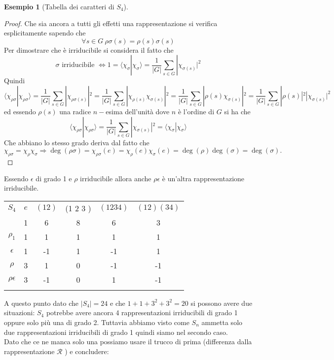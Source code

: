 \documentclass[11pt]{article}
\theoremstyle{plain}
\theoremstyle{definition}
\newtheorem{exmp}{Esempio}[section]
\theoremstyle{remark}
\begin{document}
\begin{exmp}[Tabella dei caratteri di $S_4$]
\begin{proof}
Che sia ancora a tutti gli effetti una rappresentazione si verifica esplicitamente sapendo che
\[
\forall s\in G\ \rho\sigma(s)=\rho(s)\sigma(s)
\]
Per dimostrare che è irriducibile si considera il fatto che
\[
\sigma \text{ irriducibile } \Leftrightarrow 1=\langle\chi_{\sigma}|\chi_{\sigma}\rangle=\frac{1}{|G|}\sum_{s\in G}|\chi_{\sigma(s)}|^2
\]
Quindi
\[
\langle \chi_{\rho\sigma}|\chi_{\rho\sigma}\rangle=\frac{1}{|G|}\sum_{s\in G}|\chi_{\rho\sigma(s)}|^2=\frac{1}{|G|}\sum_{s\in G}|\chi_{\rho(s)}\chi_{\sigma(s)}|^2=\frac{1}{|G|}\sum_{s\in G}|\rho(s)\chi_{\sigma(s)}|^2=\frac{1}{|G|}\sum_{s\in G}|\rho(s)|^2|\chi_{\sigma(s)}|^2
\]
ed essendo $\rho(s)$ una radice $n-$esima dell'unità dove $n$ è l'ordine di $G$ si ha che
\[
\langle \chi_{\rho\sigma}|\chi_{\rho\sigma}\rangle=\frac{1}{|G|}\sum_{s\in G}
|\chi_{\sigma(s)}|^2=\langle \chi_{\sigma}|\chi_{\sigma}\rangle
\]
Che abbiano lo stesso grado deriva dal fatto che
\[
\chi_{\rho\sigma}=\chi_{\rho}\chi_{\sigma}\Rightarrow \deg(\rho\sigma)=\chi_{\rho\sigma}(e)=\chi_{\rho}(e)\chi_{\sigma}(e)=\deg(\rho)\deg(\sigma)=\deg(\sigma).
\]
\end{proof}
Essendo $\epsilon$ di grado 1 e $\rho$ irriducibile allora anche $\rho\epsilon$ è un'altra rappresentazione irriducibile.
\begin{table}[!ht]
\centering
\begin{tabular}{|c|c|c|c|c|c|}
\hline
$S_4$  & $e$ & $(1 2)$ & (1 2 3 ) & $(1 2 3 4)$ & $(1 2)(3 4)$ \\
 & 1 & 6 & 8 & 6 & 3 \\
\hline
 $\rho_1$ & 1 & 1  & 1 & 1 & 1\\
\hline
$\epsilon$ & 1  & -1 & 1 & -1 & 1 \\
\hline
$\rho$& 3 & 1 & 0 & -1 & -1\\
\hline
$\rho\epsilon$& 3 & -1 & 0 & 1 & -1\\
\hline
& &  & & & \\
\hline
\end{tabular}
\end{table}
A questo punto dato che $|S_4|=24$ e che $1+1+3^2+3^2=20$ si possono avere due situazioni: $S_4$ potrebbe avere ancora 4 rappresentazioni irriducibili di grado 1 oppure solo più una di grado 2. Tuttavia abbiamo visto come $S_n$ ammetta solo due rappresentazioni irriducibili di grado 1 quindi siamo nel secondo caso.\\
Dato che ce ne manca solo una possiamo usare il trucco di prima (differenza dalla rappresentazione $\mathcal{R}$ ) e concludere:


\end{exmp}
\end{document}
